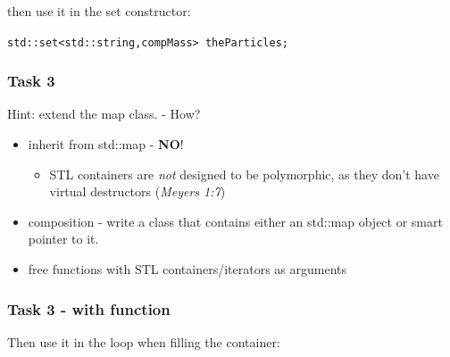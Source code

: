 then use it in the set constructor:

\texttt{std::set\textless{}std::string,compMass\textgreater{} theParticles;}

\subsubsection{Task 3}\label{task-3}

Hint: extend the map class. - How?

\begin{itemize}
\itemsep1pt\parskip0pt
\item
  inherit from std::map - \textbf{NO}!

  \begin{itemize}
  \itemsep1pt\parskip0pt
  \item
    STL containers are \emph{not} designed to be polymorphic, as they
    don't have virtual destructors (\emph{Meyers 1:7})
  \end{itemize}
\item
  composition - write a class that contains either an std::map object or
  smart pointer to it.
\item
  free functions with STL containers/iterators as arguments
\end{itemize}

\subsubsection{Task 3 - with function}\label{task-3---with-function}

\begin{Shaded}
\begin{Highlighting}[]

    
\NormalTok{\{}
   
\NormalTok{\}}
\end{Highlighting}
\end{Shaded}

Then use it in the loop when filling the container:


